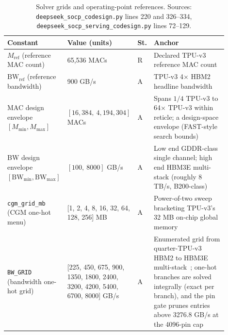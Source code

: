 \begin{table}[!htb]
\centering
\caption{Solver grids and operating-point references. Sources: \texttt{deepseek\_\allowbreak socp\_\allowbreak codesign.py} lines 220 and 326--334, \texttt{deepseek\_\allowbreak socp\_\allowbreak serving\_\allowbreak codesign.py} lines 72--129.}
\label{tab:coeff_grids}
\footnotesize\setlength{\tabcolsep}{3pt}
\begin{tabular}{@{}p{0.26\linewidth}p{0.17\linewidth}p{0.045\linewidth}p{0.42\linewidth}@{}}
\toprule
Constant & Value (units) & St. & Anchor \\
\midrule
$M_{\mathrm{ref}}$ (reference MAC count) & 65{,}536 MACs & R & Declared TPU-v3 reference MAC count \citep{jouppi2021ten} \\
$\mathrm{BW}_{\mathrm{ref}}$ (reference bandwidth) & 900 GB/s & A & TPU-v3 4$\times$ HBM2 headline bandwidth \citep{jouppi2021ten} \\
MAC design envelope $[M_{\min}, M_{\max}]$ & $[16{,}384,\allowbreak\ 4{,}194{,}304]$ MACs & A & Spans $1/4$ TPU-v3 to 64$\times$ TPU-v3 within reticle; a design-space envelope (FAST-style search bounds) \citep{zhang_fast} \\
BW design envelope $[\mathrm{BW}_{\min}, \mathrm{BW}_{\max}]$ & $[100,\ 8000]$ GB/s & A & Low end GDDR-class single channel; high end HBM3E multi-stack (roughly 8 TB/s, B200-class)~\citep{nvidia2024blackwell} \\
\texttt{cgm\_\allowbreak grid\_\allowbreak mb} (CGM one-hot menu) & [1, 2, 4, 8, 16, 32, 64, 128, 256] MB & A & Power-of-two sweep bracketing TPU-v3's 32 MB on-chip global memory \citep{jouppi2021ten} \\
\texttt{BW\_\allowbreak GRID} (bandwidth one-hot grid) & [225, 450, 675, 900, 1350, 1800, 2400, 3200, 4200, 5400, 6700, 8000] GB/s & A & Enumerated grid from quarter-TPU-v3 HBM2 to HBM3E multi-stack~\citep{jouppi2021ten,nvidia2024blackwell}; one-hot branches are solved integrally (exact per branch), and the pin gate prunes entries above 3276.8 GB/s at the 4096-pin cap \\
\bottomrule
\end{tabular}

\end{table}

